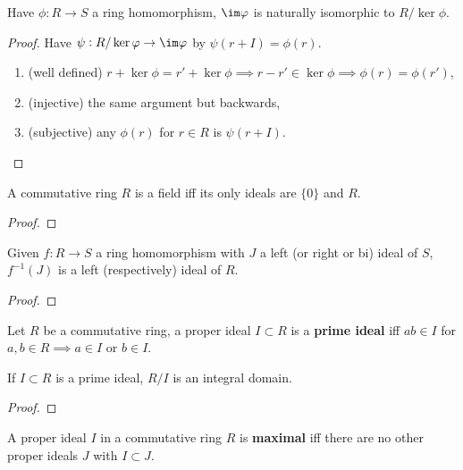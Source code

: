 \documentclass{report}
\begin{document}
\begin{theorem}\label{iso}
    Have $\phi:R\rightarrow S$ a ring homomorphism, $\im\phi$ is naturally isomorphic to $R/\ker\phi$.
    \begin{proof}
        Have $\psi:R/\ker\phi\rightarrow\im\phi$ by $\psi(r+I)=\phi(r)$. \begin{enumerate}
            \item[](well defined) $r+\ker\phi=r'+\ker\phi\implies r-r'\in\ker\phi\implies\phi(r)=\phi(r')$,
            \item[](injective) the same argument but backwards,
            \item[](subjective) any $\phi(r)$ for $r\in R$ is $\psi(r+I)$.\vspace{-20pt}
        \end{enumerate}
    \end{proof}
\end{theorem}

\begin{proposition}
    A commutative ring $R$ is a field iff its only ideals are $\{0\}$ and $R$.
    \begin{proof}
        
    \end{proof}
\end{proposition}

\begin{proposition}
    Given $f:R\rightarrow S$ a ring homomorphism with $J$ a left (or right or bi) ideal of $S$, $f^{-1}(J)$ is a left (respectively) ideal of $R$.
    \begin{proof}
        
    \end{proof}
\end{proposition}

\begin{definition}
    Let $R$ be a commutative ring, a proper ideal $I\subset R$ is a \textbf{prime ideal} iff $ab\in I$ for $a,b\in R \implies a\in I$ or $b\in I$.
\end{definition}

\begin{proposition}
    If $I\subset R$ is a prime ideal, $R/I$ is an integral domain.
    \begin{proof}
        
    \end{proof}
\end{proposition}

\begin{definition}
    A proper ideal $I$ in a commutative ring $R$ is \textbf{maximal} iff there are no other proper ideals $J$ with $I\subset J$.
\end{definition}
\end{document}
